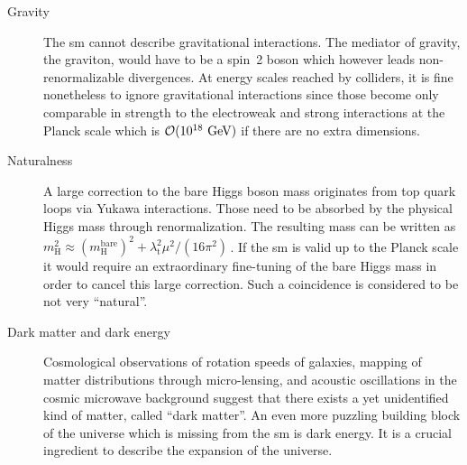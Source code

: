 \begin{description}
\item[Gravity] The \gls{sm} cannot describe gravitational interactions. The mediator of gravity, the graviton, would have to be a spin~2 boson which however leads non-renormalizable divergences. At energy scales reached by colliders, it is fine nonetheless to ignore gravitational interactions since those become only comparable in strength to the electroweak and strong interactions at the Planck scale which is $\mathcal{O}(10^{18}~\textrm{GeV})$ if there are no extra dimensions.
\item[Naturalness] A large correction to the bare Higgs boson mass originates from top quark loops via Yukawa interactions. Those need to be absorbed by the physical Higgs mass through renormalization. The resulting mass can be written as $m^{2}_\mathrm{H}\approx (m^\mathrm{bare}_\mathrm{H})^2+\lambda_\mathrm{t}^{2}\mu^2/(16\pi^2)\,$. If the \gls{sm} is valid up to the Planck scale it would require an extraordinary fine-tuning of the bare Higgs mass in order to cancel this large correction. Such a coincidence is considered to be not very ``natural''.
\item[Dark matter and dark energy] Cosmological observations of rotation speeds of galaxies, mapping of matter distributions through micro-lensing, and acoustic oscillations in the cosmic microwave background suggest that there exists a yet unidentified kind of matter, called ``dark matter''. An even more puzzling building block of the universe which is missing from the \gls{sm} is dark energy. It is a crucial ingredient to describe the expansion of the universe.

\end{description}


